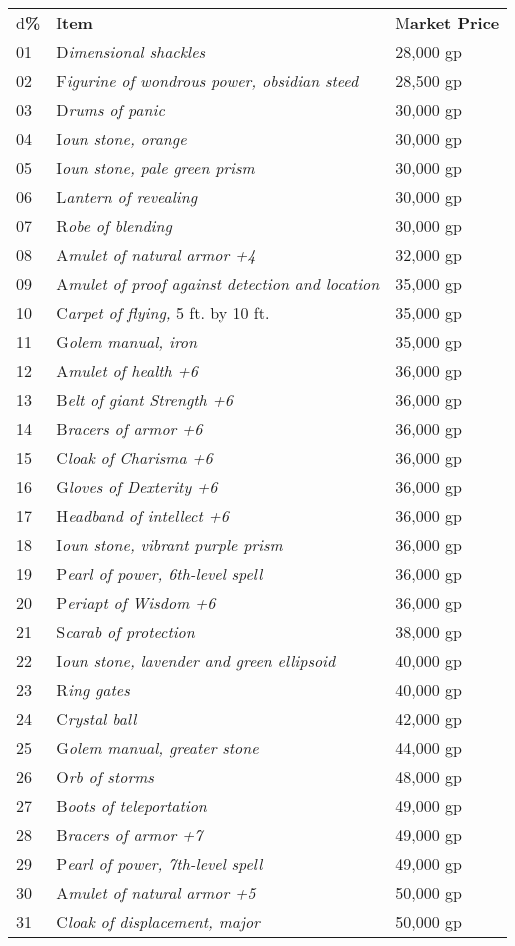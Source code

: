 \documentclass{article}
\begin{document}
\vspace{12pt}
\begin{tabular}{|>{\raggedright}p{14pt}|>{\raggedright}p{185pt}|>{\raggedright}p{55pt}|}
\hline
\multicolumn{3}{|p{255pt}|}{T\textbf{able: Major Wondrous Items}}\tabularnewline
\hline
d\textbf{\%} & I\textbf{tem} & M\textbf{arket Price}\tabularnewline
\hline
01 & D\textit{imensional shackles} & 28,000 gp\tabularnewline
\hline
02 & F\textit{igurine of wondrous power, obsidian steed} & 28,500 gp\tabularnewline
\hline
03 & D\textit{rums of panic} & 30,000 gp\tabularnewline
\hline
04 & I\textit{oun stone, orange} & 30,000 gp\tabularnewline
\hline
05 & I\textit{oun stone, pale green prism} & 30,000 gp\tabularnewline
\hline
06 & L\textit{antern of revealing} & 30,000 gp\tabularnewline
\hline
07 & R\textit{obe of blending} & 30,000 gp\tabularnewline
\hline
08 & A\textit{mulet of natural armor +4} & 32,000 gp\tabularnewline
\hline
09 & A\textit{mulet of proof against detection and location} & 35,000 gp\tabularnewline
\hline
10 & C\textit{arpet of flying, }5 ft. by 10 ft. & 35,000 gp\tabularnewline
\hline
11 & G\textit{olem manual, iron} & 35,000 gp\tabularnewline
\hline
12 & A\textit{mulet of health +6} & 36,000 gp\tabularnewline
\hline
13 & B\textit{elt of giant Strength +6} & 36,000 gp\tabularnewline
\hline
14 & B\textit{racers of armor +6} & 36,000 gp\tabularnewline
\hline
15 & C\textit{loak of Charisma +6} & 36,000 gp\tabularnewline
\hline
16 & G\textit{loves of Dexterity +6} & 36,000 gp\tabularnewline
\hline
17 & H\textit{eadband of intellect +6} & 36,000 gp\tabularnewline
\hline
18 & I\textit{oun stone, vibrant purple prism} & 36,000 gp\tabularnewline
\hline
19 & P\textit{earl of power, 6th-level spell} & 36,000 gp\tabularnewline
\hline
20 & P\textit{eriapt of Wisdom +6} & 36,000 gp\tabularnewline
\hline
21 & S\textit{carab of protection} & 38,000 gp\tabularnewline
\hline
22 & I\textit{oun stone, lavender and green ellipsoid} & 40,000 gp\tabularnewline
\hline
23 & R\textit{ing gates} & 40,000 gp\tabularnewline
\hline
24 & C\textit{rystal ball} & 42,000 gp\tabularnewline
\hline
25 & G\textit{olem manual, greater stone} & 44,000 gp\tabularnewline
\hline
26 & O\textit{rb of storms} & 48,000 gp\tabularnewline
\hline
27 & B\textit{oots of teleportation} & 49,000 gp\tabularnewline
\hline
28 & B\textit{racers of armor +7} & 49,000 gp\tabularnewline
\hline
29 & P\textit{earl of power, 7th-level spell} & 49,000 gp\tabularnewline
\hline
30 & A\textit{mulet of natural armor +5} & 50,000 gp\tabularnewline
\hline
31 & C\textit{loak of displacement, major} & 50,000 gp\tabularnewline

\end{tabular}
\end{document}
